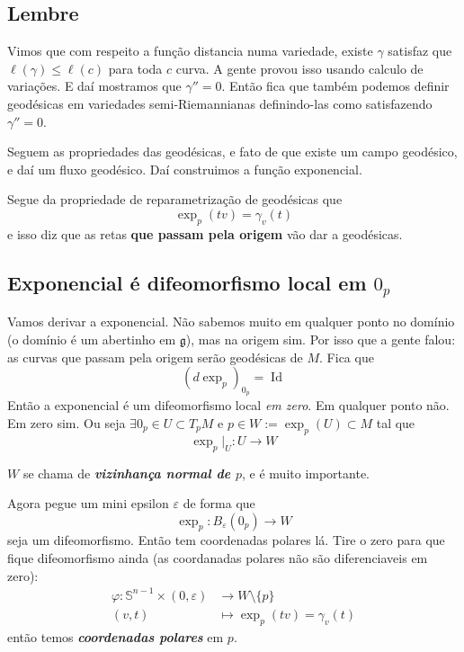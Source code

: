 \subsection{Lembre}

Vimos que com respeito a função distancia numa variedade, existe \(\gamma\) satisfaz que \(\ell(\gamma) \leq  \ell(c)\) para toda \(c\) curva. A gente provou isso usando calculo de variações. E daí mostramos que \(\gamma''=0\). Então fica que também podemos definir geodésicas em variedades semi-Riemannianas definindo-las como satisfazendo \(\gamma''=0\).

Seguem as propriedades das geodésicas, e fato de que existe um campo geodésico, e daí um fluxo geodésico. Daí construimos a função exponencial.

Segue da propriedade de reparametrização de geodésicas que
\[\operatorname{exp}_p(tv)=\gamma_v(t)\]
e isso diz que as retas \textbf{que passam pela origem} vão dar a geodésicas.

\subsection{Exponencial é difeomorfismo local em \(0_p\)}

Vamos derivar a exponencial. Não sabemos muito em qualquer ponto no domínio (o domínio é um abertinho em \(\mathfrak{g}\)), mas na origem sim. Por isso que a gente falou: as curvas que passam pela origem serão geodésicas de \(M\). Fica que
\[(d \operatorname{exp}_p)_{0_p}=\operatorname{Id}\]
Então a exponencial é um difeomorfismo local \textit{em zero}. Em qualquer ponto não. Em zero sim. Ou seja \(\exists  0_p \in U \subset T_pM\) e \( p \in W:=\operatorname{exp}_p(U) \subset M\) tal que
\[\operatorname{exp}_p |_{U}:U \to W\]
\begin{defn}\leavevmode
\(W\) se chama de \textit{\textbf{vizinhança normal de \(p\)}}, e é muito importante.
\end{defn}
Agora pegue um mini epsilon \(\varepsilon\) de forma que
\[\operatorname{exp}_p:B_\varepsilon(0_p) \longrightarrow W\]
seja um difeomorfismo. Então tem coordenadas polares lá. Tire o zero para que fique difeomorfismo ainda (as coordanadas polares não são diferenciaveis em zero):
\begin{align*}
	\varphi: \mathbb{S}^{n-1}\times(0,\varepsilon) &\longrightarrow W\setminus\{p\} \\
	(v,t) &\longmapsto \operatorname{exp}_p(tv)=\gamma_v(t)
\end{align*}
então temos \textit{\textbf{coordenadas polares}} em \(p\).

